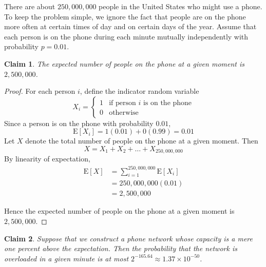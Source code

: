 \documentclass{article}
\newtheorem{claim}{Claim}
\begin{document}
There are about $250{,}000{,}000$ people in the United States who might use a phone. To keep the problem 
simple, we ignore the fact that people are on the phone more often at certain times of day and on certain 
days of the year. Assume that each person is on the phone during each minute mutually independently with 
probability $p = 0.01$.

\begin{claim}
    The expected number of people on the phone at a given moment is $2{,}500{,}000$.
\end{claim}

\begin{proof}
    For each person $i$, define the indicator random variable
    \[
    X_i =
    \begin{cases}
    1 & \text{if person } i \text{ is on the phone} \\
    0 & \text{otherwise}
    \end{cases}
    \]
    Since a person is on the phone with probability $0.01$,
    \[
    \mathrm{E}[X_i] = 1(0.01) + 0(0.99) = 0.01
    \]
    Let $X$ denote the total number of people on the phone at a given moment. Then
    \[
    X = X_1 + X_2 + \dots + X_{250{,}000{,}000}
    \]
    By linearity of expectation,
    \[
    \begin{aligned}
    \mathrm{E}[X] &= \sum_{i=1}^{250{,}000{,}000}\mathrm{E}[X_i] \\ 
    &= 250{,}000{,}000(0.01) \\
    &= 2{,}500{,}000
    \end{aligned}
    \]

    \medskip

    Hence the expected number of people on the phone at a given moment is $2{,}500{,}000$.
\end{proof}

\begin{claim}
    Suppose that we construct a phone network whose capacity is a mere one percent above the expectation.
    Then the probability that the network is overloaded in a given minute is at most 
    $2^{-165.64} \approx 1.37 \times 10^{-50}$. %
\end{claim}
\end{document}
